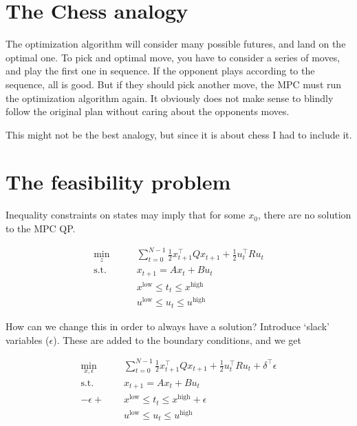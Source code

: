 \documentclass{article}
\begin{document}
\section{The Chess analogy}

\begin{center}
\end{center}

The optimization algorithm will consider many possible futures, and land on the optimal one. To pick
and optimal move, you have to consider a series of moves, and play the first one in sequence. If the opponent plays according to the sequence, 
all is good. But if they should pick another move, the MPC must run the optimization algorithm again. It obviously does not make sense to blindly follow 
the original plan without caring about the opponents moves. 

This might not be the best analogy, but since it is about chess I had to include it. 

\section{The feasibility problem}

Inequality constraints on states may imply that for some $x_0$, there are no solution to the MPC QP. 

\begin{align*}
  \min_z \qquad& \sum_{t=0}^{N-1} \frac{1}{2} x_{t+1}^{\top}Qx_{t+1} + \frac{1}{2} u_t^{\top}Ru_t \\ 
  \text{s.t.}\qquad& x_{t+1} = Ax_t + Bu_t  \\ 
  & x^{\text{low}} \leq t_t \leq x^{\text{high}} \\ 
  & u^{\text{low}} \leq u_t \leq u^{\text{high}}
\end{align*}

How can we change this in order to always have a solution? Introduce `slack' variables ($\epsilon$). These are added to the boundary conditions, and we get

\begin{align*}
  \min_{x, \epsilon} \qquad& \sum_{t=0}^{N-1} \frac{1}{2} x_{t+1}^{\top}Qx_{t+1} + \frac{1}{2} u_t^{\top}Ru_t + \delta ^{\top} \epsilon \\ 
  \text{s.t.}\qquad& x_{t+1} = Ax_t + Bu_t  \\ 
  -\epsilon + & x^{\text{low}} \leq t_t \leq x^{\text{high}} + \epsilon \\ 
  & u^{\text{low}} \leq u_t \leq u^{\text{high}}
\end{align*}
\end{document}
